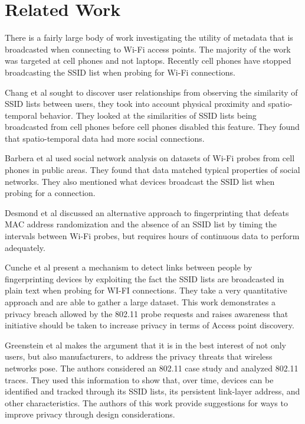 \documentclass[letterpaper,twocolumn,10pt]{article}
\begin{document}
\section{Related Work}
There is a fairly large body of work investigating the utility of metadata that is broadcasted when connecting to Wi-Fi access points. The majority of the work was targeted at cell phones and not laptops. Recently cell phones have stopped broadcasting the SSID list when probing for Wi-Fi connections.

Chang et al  sought to discover user relationships from observing the similarity of SSID lists between users, they took into account physical proximity and spatio-temporal behavior. They looked at the similarities of SSID lists being broadcasted from cell phones before cell phones disabled this feature. They found that spatio-temporal data had more social connections. 

Barbera et al  used social network analysis on datasets of Wi-Fi probes from cell phones in public areas. They found that data matched typical properties of social networks. They also mentioned what devices broadcast the SSID list when probing for a connection.

Desmond et al discussed an alternative approach to fingerprinting that defeats MAC address 
randomization and the absence of an SSID list by timing the intervals between Wi-Fi probes, but requires hours of continuous data to perform adequately.

Cunche et al  present a mechanism to detect links between people by fingerprinting devices by exploiting the fact the SSID lists are broadcasted in plain text when probing for WI-FI connections. They take a very quantitative approach and are able to gather a large dataset. This work demonstrates a privacy breach allowed by the 802.11 probe requests and raises awareness that initiative should be taken to increase privacy in terms of Access point discovery. 

Greenstein et al makes the argument that it is in the best interest of not only users, but also manufacturers, to address the privacy threats that wireless networks pose. The authors considered an 802.11 case study and analyzed 802.11 traces. They used this information to show that, over time, devices can be identified and tracked through its SSID lists, its persistent link-layer address, and other characteristics. The authors of this work provide suggestions for ways to improve privacy through design considerations.
\end{document}
